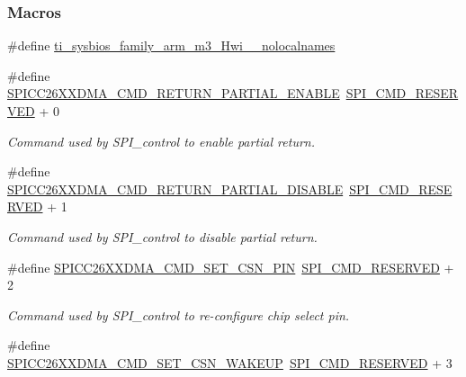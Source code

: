 \subsubsection*{Macros}
\begin{DoxyCompactItemize}
\item 
\#define \hyperlink{_s_p_i_c_c26_x_x_d_m_a_8h_aaa17ecf48f5762e2e1bdb0bab8aacf0c}{ti\+\_\+sysbios\+\_\+family\+\_\+arm\+\_\+m3\+\_\+\+Hwi\+\_\+\+\_\+nolocalnames}
\item 
\#define \hyperlink{group___s_p_i___c_m_d_ga348d271d5ad295c5e049e78d745c57e1}{S\+P\+I\+C\+C26\+X\+X\+D\+M\+A\+\_\+\+C\+M\+D\+\_\+\+R\+E\+T\+U\+R\+N\+\_\+\+P\+A\+R\+T\+I\+A\+L\+\_\+\+E\+N\+A\+B\+L\+E}~\hyperlink{group___s_p_i___c_o_n_t_r_o_l_ga3d23d16525ee76f77276472d8dea80b0}{S\+P\+I\+\_\+\+C\+M\+D\+\_\+\+R\+E\+S\+E\+R\+V\+E\+D} + 0
\begin{DoxyCompactList}\small\item\em Command used by S\+P\+I\+\_\+control to enable partial return. \end{DoxyCompactList}\item 
\#define \hyperlink{group___s_p_i___c_m_d_gaff8de4036abcdb2903cb5280120c30b4}{S\+P\+I\+C\+C26\+X\+X\+D\+M\+A\+\_\+\+C\+M\+D\+\_\+\+R\+E\+T\+U\+R\+N\+\_\+\+P\+A\+R\+T\+I\+A\+L\+\_\+\+D\+I\+S\+A\+B\+L\+E}~\hyperlink{group___s_p_i___c_o_n_t_r_o_l_ga3d23d16525ee76f77276472d8dea80b0}{S\+P\+I\+\_\+\+C\+M\+D\+\_\+\+R\+E\+S\+E\+R\+V\+E\+D} + 1
\begin{DoxyCompactList}\small\item\em Command used by S\+P\+I\+\_\+control to disable partial return. \end{DoxyCompactList}\item 
\#define \hyperlink{group___s_p_i___c_m_d_gab3ab03abd9ca073344acdcc6b442f9eb}{S\+P\+I\+C\+C26\+X\+X\+D\+M\+A\+\_\+\+C\+M\+D\+\_\+\+S\+E\+T\+\_\+\+C\+S\+N\+\_\+\+P\+I\+N}~\hyperlink{group___s_p_i___c_o_n_t_r_o_l_ga3d23d16525ee76f77276472d8dea80b0}{S\+P\+I\+\_\+\+C\+M\+D\+\_\+\+R\+E\+S\+E\+R\+V\+E\+D} + 2
\begin{DoxyCompactList}\small\item\em Command used by S\+P\+I\+\_\+control to re-\/configure chip select pin. \end{DoxyCompactList}\item 
\#define \hyperlink{group___s_p_i___c_m_d_gae07fd93964e63fc93795835eaa14b589}{S\+P\+I\+C\+C26\+X\+X\+D\+M\+A\+\_\+\+C\+M\+D\+\_\+\+S\+E\+T\+\_\+\+C\+S\+N\+\_\+\+W\+A\+K\+E\+U\+P}~\hyperlink{group___s_p_i___c_o_n_t_r_o_l_ga3d23d16525ee76f77276472d8dea80b0}{S\+P\+I\+\_\+\+C\+M\+D\+\_\+\+R\+E\+S\+E\+R\+V\+E\+D} + 3

\end{DoxyCompactItemize}
